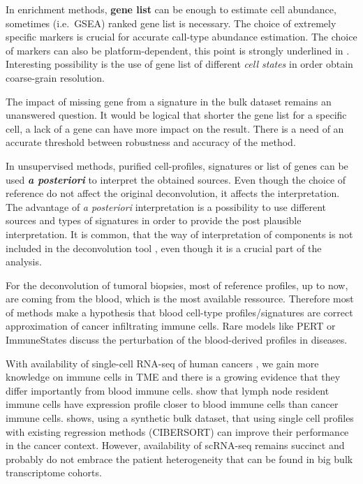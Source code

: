 \documentclass[12pt,]{book}
\theoremstyle{definition}
\theoremstyle{definition}
\theoremstyle{definition}
\theoremstyle{remark}
\begin{document}
In enrichment methods, \textbf{gene list} can be enough to estimate cell
abundance, sometimes (i.e.~GSEA) ranked gene list is necessary. The
choice of extremely specific markers is crucial for accurate call-type
abundance estimation. The choice of markers can also be
platform-dependent, this point is strongly underlined in
\citep{Becht2016}. Interesting possibility is the use of gene list of
different \emph{cell states} in order obtain coarse-grain resolution.

The impact of missing gene from a signature in the bulk dataset remains
an unanswered question. It would be logical that shorter the gene list
for a specific cell, a lack of a gene can have more impact on the
result. There is a need of an accurate threshold between robustness and
accuracy of the method.

In unsupervised methods, purified cell-profiles, signatures or list of
genes can be used \emph{\textbf{a posteriori}} to interpret the obtained
sources. Even though the choice of reference do not affect the original
deconvolution, it affects the interpretation. The advantage of \emph{a
posteriori} interpretation is a possibility to use different sources and
types of signatures in order to provide the post plausible
interpretation. It is common, that the way of interpretation of
components is not included in the deconvolution tool
\citep[\citet{Newberg2018}, \citet{Moffitt2015}]{Wang2016}, even though
it is a crucial part of the analysis.

For the deconvolution of tumoral biopsies, most of reference profiles,
up to now, are coming from the blood, which is the most available
ressource. Therefore most of methods make a hypothesis that blood
cell-type profiles/signatures are correct approximation of cancer
infiltrating immune cells. Rare models like PERT \citep{Qiao2012} or
ImmuneStates \citep{Vallania2017} discuss the perturbation of the
blood-derived profiles in diseases.

With availability of single-cell RNA-seq of human cancers
\citep{Chung2017, Lavin2017, Li2017, Puram2017, Schelker2017, Tirosh2016, Zheng2017},
we gain more knowledge on immune cells in TME and there is a growing
evidence that they differ importantly from blood immune cells.
\citet{Racle2017} show that lymph node resident immune cells have
expression profile closer to blood immune cells than cancer immune
cells. \citet{Schelker2017} shows, using a synthetic bulk dataset, that
using single cell profiles with existing regression methods (CIBERSORT)
can improve their performance in the cancer context. However,
availability of scRNA-seq remains succinct and probably do not embrace
the patient heterogeneity that can be found in big bulk transcriptome
cohorts.
\end{document}
